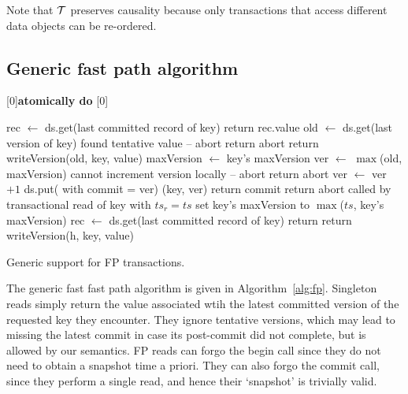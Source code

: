 Note that  ${\cal T}$  preserves causality because 
only transactions that  access different data objects can be re-ordered.


\subsection{Generic fast path algorithm}
\label{ssec:fast-algorithm}



\begin{algorithm}[htb]
[0]{{\bf atomically do}}
[0]{}
\begin{algorithmic}
\small
{}
\State rec  $\leftarrow$ ds.get(last committed record of key) 
\State  return rec.value
\EndProcedure
%
\Statex
{} 
	\State old $\leftarrow$ ds.get(last version of key)
	  \Comment found tentative value -- abort 
		\State return abort 
	\EndIf
	\State return {\sc writeVersion}(old, key, value)
\EndProcedure
%
\Statex
{} 
	\State maxVersion $\leftarrow$ key's  maxVersion
	\State ver $\leftarrow$ $\max$(old, maxVersion) 
		\State \Comment cannot increment version locally -- abort
		\State return abort 
	\EndIf
	\State 	ver $\leftarrow$ ver  $+1$ 
\Atomic 
	\State ds.put( with commit = ver)  
	(key, ver)
	\State return commit
	\Else \State return abort \EndIf
\EndAtomic
\EndProcedure
{} 
\Statex \Comment called by transactional read of key with  $ts_r = ts$
	 set key's maxVersion to
	\State \hspace{10mm} $\max$($ts$, key's maxVersion) 
\EndProcedure
\Statex
{} 
\State rec  $\leftarrow$ ds.get(last committed record of key) 
\State  return 
\EndProcedure
\Statex
{} 
\State return {\sc writeVersion}(h, key, value)
\EndProcedure

\end{algorithmic}
\caption{Generic support for FP transactions.}
\label{alg:fp}
\end{algorithm}

The generic fast fast path algorithm is given in Algorithm~\ref{alg:fp}. 
%
Singleton reads simply return the value associated wtih the  latest committed version of the requested key they encounter.  
They ignore tentative versions, which may lead to missing the latest commit in case its post-commit did not complete, 
but is allowed by our semantics. 
FP reads can forgo the begin call since they do not need to obtain a snapshot time a priori. 
They can also forgo the commit call, since they perform a single read, and hence their `snapshot' is trivially valid.

